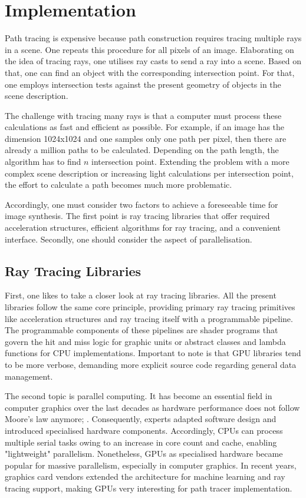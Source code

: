 \chapter{Implementation}

Path tracing is expensive because path construction requires tracing multiple rays in a scene.
One repeats this procedure for all pixels of an image.
Elaborating on the idea of tracing rays, one utilises ray casts to send a ray into a scene. 
Based on that, one can find an object with the corresponding intersection point.
For that, one employs intersection tests against the present geometry of objects in the scene description.

The challenge with tracing many rays is that a computer must process these calculations as fast and efficient as possible.
For example, if an image has the dimension 1024x1024 and one samples only one path per pixel, then there are already a million paths to be calculated. 
Depending on the path length, the algorithm has to find $n$ intersection point.
Extending the problem with a more complex scene description or increasing light calculations per intersection point, the effort to calculate a path becomes much more problematic.

Accordingly, one must consider two factors to achieve a foreseeable time for image synthesis.
The first point is ray tracing libraries that offer required acceleration structures, efficient algorithms for ray tracing, and a convenient interface.
Secondly, one should consider the aspect of parallelisation.

\section{Ray Tracing Libraries}

First, one likes to take a closer look at ray tracing libraries.
All the present libraries follow the same core principle, providing primary ray tracing primitives like acceleration structures and ray tracing itself with a programmable pipeline.
The programmable components of these pipelines are shader programs that govern the hit and miss logic for graphic units or abstract classes and lambda functions for CPU implementations.
Important to note is that GPU libraries tend to be more verbose, demanding more explicit source code regarding general data management.

The second topic is parallel computing.
It has become an essential field in computer graphics over the last decades as hardware performance does not follow Moore's law anymore; \cite{theis_end_2017}.
Consequently, experts adapted software design and introduced specialised hardware components.
Accordingly, CPUs can process multiple serial tasks owing to an increase in core count and cache, enabling "lightweight" parallelism.
Nonetheless, GPUs as specialised hardware became popular for massive parallelism, especially in computer graphics.
In recent years, graphics card vendors extended the architecture for machine learning and ray tracing support, making GPUs very interesting for path tracer implementation.

